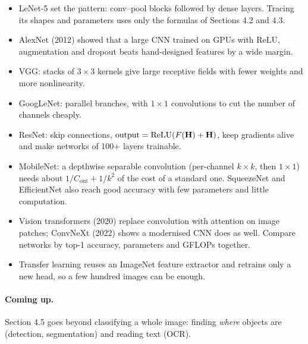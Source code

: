 \documentclass[12pt, a4paper]{article}
\providecommand{\bH}{\mathbf{H}}
\begin{document}
\begin{itemize}
  \item LeNet-5 set the pattern: conv--pool blocks followed by dense layers.
        Tracing its shapes and parameters uses only the formulas of
        Sections 4.2 and 4.3.
  \item AlexNet (2012) showed that a large CNN trained on GPUs with ReLU,
        augmentation and dropout beats hand-designed features by a wide
        margin.
  \item VGG: stacks of $3\times3$ kernels give large receptive fields with
        fewer weights and more nonlinearity.
  \item GoogLeNet: parallel branches, with $1\times1$ convolutions to cut the
        number of channels cheaply.
  \item ResNet: skip connections, $\text{output} = \relu(F(\bH) + \bH)$, keep
        gradients alive and make networks of 100+ layers trainable.
  \item MobileNet: a depthwise separable convolution (per-channel $k\times k$,
        then $1\times1$) needs about $1/C_{\text{out}} + 1/k^2$ of the cost of
        a standard one. SqueezeNet and EfficientNet also reach good accuracy
        with few parameters and little computation.
  \item Vision transformers (2020) replace convolution with attention on image
        patches; ConvNeXt (2022) shows a modernised CNN does as well. Compare
        networks by top-1 accuracy, parameters and GFLOPs together.
  \item Transfer learning reuses an ImageNet feature extractor and retrains
        only a new head, so a few hundred images can be enough.
\end{itemize}

\paragraph{Coming up.}
Section 4.5 goes beyond classifying a whole image: finding \emph{where}
objects are (detection, segmentation) and reading text (OCR).
\end{document}
